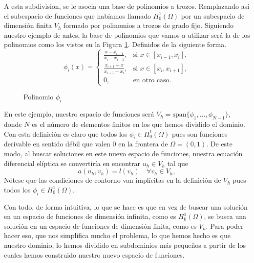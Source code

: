 \documentclass[a4paper,11pt,spanish, twoside, leqno]{tfg-uam}
\theoremstyle{definition}
\begin{document}
A esta subdivision, se le asocia una base de polinomios a trozos. Remplazando así el subespacio de funciones que habíamos llamado $H_0^1(\Omega)$ por un subespacio de dimensión finita $V_h$ formado por polinomios a trozos  de grado fijo. Siguiendo nuestro ejemplo de antes, la base de polinomios que vamos a utilizar será la de los polinomios como los vistos en la Figura \ref{fig:BasePolinomios}. Definidos de la siguiente forma.
\begin{equation*}
    \phi_i(x) = \begin{cases}
        \frac{x-x_{i-1}}{x_i-x_{i-1}}, & \text{si } x\in[x_{i-1},x_i],\\
        \frac{x_{i+1}-x}{x_{i+1}-x_i}, & \text{si } x\in[x_i,x_{i+1}],\\
        0, & \text{en otro caso}.
    \end{cases} 
\end{equation*}

\begin{figure}
    \centering
    \caption{Polinomio $\phi_i$}
    \label{fig:BasePolinomios}
\end{figure}

En este ejemplo, nuestro espacio de funciones será $V_h = \text{span}\{\phi_1,\dots,\phi_{N-1}\}$, donde $N$ es el número de elementos finitos en los que hemos dividido el dominio. Con esta definición es claro que todos los $\phi_i\in H_0^1(\Omega)$ pues son funciones derivable en sentido débil que valen $0$ en la frontera de $\Omega =(0,1)$. De este modo, al buscar soluciones en este nuevo espacio de funciones, nuestra ecuación diferencial elíptica se convertiría en encontrar $u_h\in V_h$ tal que
\begin{equation*}
    a(u_h,v_h) = l(v_h) \quad \forall v_h\in V_h,
\end{equation*}
Nótese que las condiciones de contorno van implícitas en la definición de $V_h$ pues todos los $\phi_i\in H_0^1(\Omega)$. 

Con todo, de forma intuitiva, lo que se hace es que en vez de buscar una solución en un espacio de funciones de dimensión infinita, como es $H_0^1(\Omega)$, se busca una solución en un espacio de funciones de dimensión finita, como es $V_h$. Para poder hacer eso, que nos simplifica mucho el problema, lo que hemos hecho es que nuestro dominio, lo hemos dividido en subdominios más pequeños a partir de los cuales hemos construido nuestro nuevo espacio de funciones. 
\end{document}
